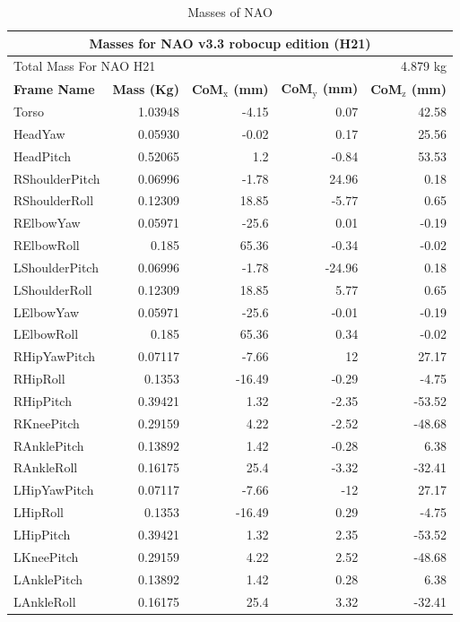 \begin{table}[position specifier]
\caption{Masses of NAO}
\begin{tabular}{|l|r|r|r|r|}
\hline
\multicolumn{5}{|c|}{\textbf{Masses for NAO v3.3 robocup edition (H21)}} \\ \hline
\multicolumn{3}{|l|}{Total Mass For NAO H21} & \multicolumn{2}{|r|}{4.879 kg}\\ \hline
\textbf{Frame Name} & \textbf{Mass (Kg)} & \textbf{CoM$_{\text{x}}$ (mm)} & \textbf{CoM$_{\text{y}}$ (mm)} & \textbf{CoM$_{\text{z}}$ (mm)}\\ \hline
Torso & 1.03948 & -4.15 & 0.07 & 42.58 \\ \hline
HeadYaw & 0.05930 & -0.02 & 0.17 & 25.56 \\ \hline
HeadPitch & 0.52065 & 1.2 & -0.84 & 53.53 \\ \hline
RShoulderPitch & 0.06996 & -1.78 & 24.96 & 0.18 \\ \hline
RShoulderRoll & 0.12309 & 18.85 & -5.77 & 0.65 \\ \hline
RElbowYaw & 0.05971 & -25.6 & 0.01 & -0.19 \\ \hline
RElbowRoll & 0.185 & 65.36 & -0.34 & -0.02 \\ \hline
LShoulderPitch & 0.06996 & -1.78 & -24.96 & 0.18 \\ \hline
LShoulderRoll & 0.12309 & 18.85 & 5.77 & 0.65 \\ \hline
LElbowYaw & 0.05971 & -25.6 & -0.01 & -0.19 \\ \hline
LElbowRoll & 0.185 & 65.36 & 0.34 & -0.02 \\ \hline
RHipYawPitch & 0.07117 & -7.66 & 12 & 27.17 \\ \hline
RHipRoll & 0.1353 & -16.49 & -0.29 & -4.75 \\ \hline
RHipPitch & 0.39421 & 1.32 & -2.35 & -53.52 \\ \hline
RKneePitch & 0.29159 & 4.22 & -2.52 & -48.68 \\ \hline
RAnklePitch & 0.13892 & 1.42 & -0.28 & 6.38 \\ \hline
RAnkleRoll & 0.16175 & 25.4 & -3.32 & -32.41 \\ \hline
LHipYawPitch & 0.07117 & -7.66 & -12 & 27.17 \\ \hline
LHipRoll & 0.1353 & -16.49 & 0.29 & -4.75 \\ \hline
LHipPitch & 0.39421 & 1.32 & 2.35 & -53.52 \\ \hline
LKneePitch & 0.29159 & 4.22 & 2.52 & -48.68 \\ \hline
LAnklePitch & 0.13892 & 1.42 & 0.28 & 6.38 \\ \hline
LAnkleRoll & 0.16175 & 25.4 & 3.32 & -32.41 \\ \hline
\end{tabular}
\label{tab:Masses of NAO}
\end{table}

